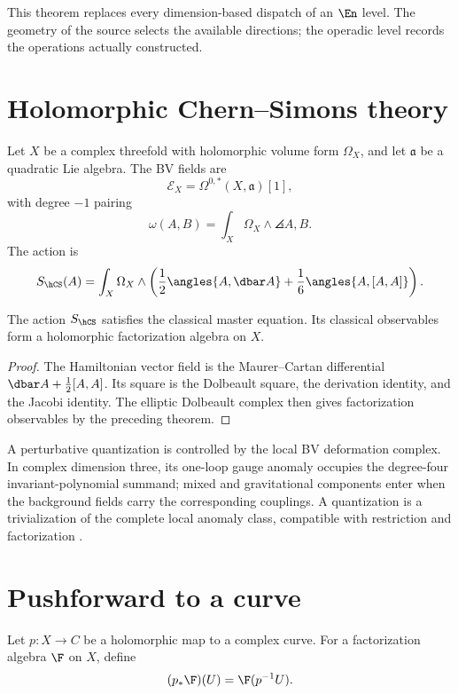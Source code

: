 This theorem replaces every dimension-based dispatch of an $\En$ level.  The geometry of the source selects the available directions; the operadic level records the operations actually constructed.

\chapter{Holomorphic Chern--Simons theory}
Let $X$ be a complex threefold with holomorphic volume form $\Omega_X$, and let $\mathfrak a$ be a quadratic Lie algebra. The BV fields are
\[
 \mathcal E_X=\Omega^{0,*}(X,\mathfrak a)[1],
\]
with degree $-1$ pairing
\[
 \omega(A,B)=\int_X\Omega_X\wedge\angles{A,B}.
\]
The action is
\[
 S_{\hCS}(A)=\int_X\Omega_X\wedge
 \left(\frac12\angles{A,\dbar A}+\frac16\angles{A,[A,A]}\right).
\]

\begin{theorem}
The action $S_{\hCS}$ satisfies the classical master equation. Its classical observables form a holomorphic factorization algebra on $X$.
\end{theorem}
\begin{proof}
The Hamiltonian vector field is the Maurer--Cartan differential $\dbar A+\frac12[A,A]$. Its square is the Dolbeault square, the derivation identity, and the Jacobi identity. The elliptic Dolbeault complex then gives factorization observables by the preceding theorem.
\end{proof}

A perturbative quantization is controlled by the local BV deformation complex. In complex dimension three, its one-loop gauge anomaly occupies the degree-four invariant-polynomial summand; mixed and gravitational components enter when the background fields carry the corresponding couplings. A quantization is a trivialization of the complete local anomaly class, compatible with restriction and factorization \cite{CostelloLiAnomaly}.

\chapter{Pushforward to a curve}
Let $p:X\to C$ be a holomorphic map to a complex curve. For a factorization algebra $\F$ on $X$, define
\[
 (p_*\F)(U)=\F(p^{-1}U).
\]

